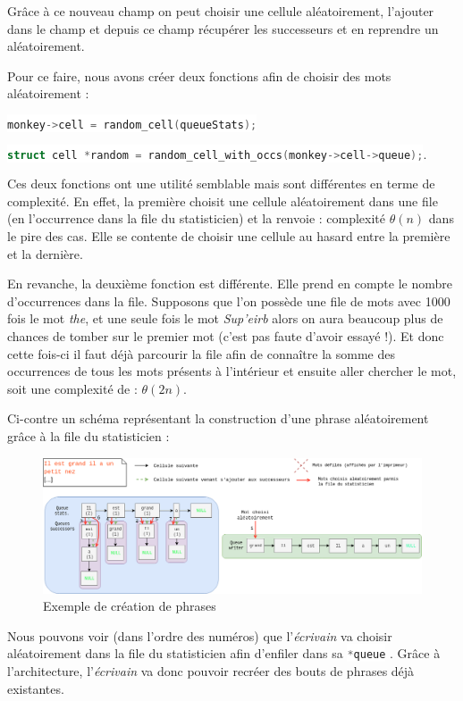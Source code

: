\documentclass{article}
\newcommand{\inlinecode}[2]{\colorbox{white}{\lstinline[language=#1]$#2$}}
\begin{document}
Grâce à ce nouveau champ on peut choisir une cellule aléatoirement, l'ajouter dans le champ et depuis ce champ récupérer les successeurs et en reprendre un aléatoirement.

Pour ce faire, nous avons créer deux fonctions afin de choisir des mots aléatoirement :

\inlinecode{C}{monkey->cell = random_cell(queueStats);}

\inlinecode{C}{struct cell *random = random_cell_with_occs(monkey->cell->queue);}.
\label{lst:random_cells}

\label{complexite_random_cell}

Ces deux fonctions ont une utilité semblable mais sont différentes en terme de complexité. En effet, la première choisit une cellule aléatoirement dans une file (en l'occurrence dans la file du statisticien) et la renvoie : complexité $\theta(n)$ dans le pire des cas. Elle se contente de choisir une cellule au hasard entre la première et la dernière.

En revanche, la deuxième fonction est différente. Elle prend en compte le nombre d'occurrences dans la file. Supposons que l'on possède une file de mots avec 1000 fois le mot \textit{the}, et une seule fois le mot \textit{Sup'eirb} alors on aura beaucoup plus de chances de tomber sur le premier mot (c'est pas faute d'avoir essayé !). Et donc cette fois-ci il faut déjà parcourir la file afin de connaître la somme des occurrences de tous les mots présents à l'intérieur et ensuite aller chercher le mot, soit une complexité de : $\theta(2n)$.

Ci-contre un schéma représentant la construction d'une phrase aléatoirement grâce à la file du statisticien :

\begin{figure}[ht!]
\centering
\includegraphics[scale=0.35]{writerwork.png}
\caption{Exemple de création de phrases}
\label{fig:writer_work}
\end{figure}

Nous pouvons voir (dans l'ordre des numéros) que l'\textit{écrivain} va choisir aléatoirement dans la file du statisticien afin d'enfiler dans sa \inlinecode{C}{*queue} . Grâce à l'architecture, l'\textit{écrivain} va donc pouvoir recréer des bouts de phrases déjà existantes.
\end{document}
